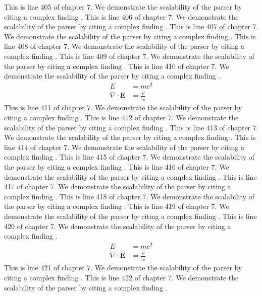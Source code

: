 This is line 405 of chapter 7. We demonstrate the scalability of the parser by citing a complex finding \cite{ref7_405}.
This is line 406 of chapter 7. We demonstrate the scalability of the parser by citing a complex finding \cite{ref7_406}.
This is line 407 of chapter 7. We demonstrate the scalability of the parser by citing a complex finding \cite{ref7_407}.
This is line 408 of chapter 7. We demonstrate the scalability of the parser by citing a complex finding \cite{ref7_408}.
This is line 409 of chapter 7. We demonstrate the scalability of the parser by citing a complex finding \cite{ref7_409}.
This is line 410 of chapter 7. We demonstrate the scalability of the parser by citing a complex finding \cite{ref7_410}.
\begin{align*}
  E &= mc^2 \\
  \nabla \cdot \mathbf{E} &= \frac{\rho}{\varepsilon_0}
\end{align*}
This is line 411 of chapter 7. We demonstrate the scalability of the parser by citing a complex finding \cite{ref7_411}.
This is line 412 of chapter 7. We demonstrate the scalability of the parser by citing a complex finding \cite{ref7_412}.
This is line 413 of chapter 7. We demonstrate the scalability of the parser by citing a complex finding \cite{ref7_413}.
This is line 414 of chapter 7. We demonstrate the scalability of the parser by citing a complex finding \cite{ref7_414}.
This is line 415 of chapter 7. We demonstrate the scalability of the parser by citing a complex finding \cite{ref7_415}.
This is line 416 of chapter 7. We demonstrate the scalability of the parser by citing a complex finding \cite{ref7_416}.
This is line 417 of chapter 7. We demonstrate the scalability of the parser by citing a complex finding \cite{ref7_417}.
This is line 418 of chapter 7. We demonstrate the scalability of the parser by citing a complex finding \cite{ref7_418}.
This is line 419 of chapter 7. We demonstrate the scalability of the parser by citing a complex finding \cite{ref7_419}.
This is line 420 of chapter 7. We demonstrate the scalability of the parser by citing a complex finding \cite{ref7_420}.
\begin{align*}
  E &= mc^2 \\
  \nabla \cdot \mathbf{E} &= \frac{\rho}{\varepsilon_0}
\end{align*}
This is line 421 of chapter 7. We demonstrate the scalability of the parser by citing a complex finding \cite{ref7_421}.
This is line 422 of chapter 7. We demonstrate the scalability of the parser by citing a complex finding \cite{ref7_422}.
